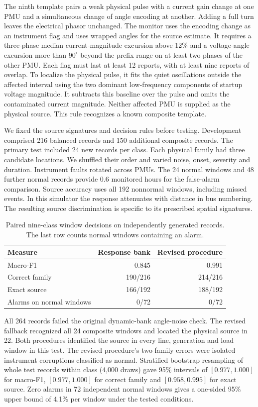 The ninth template pairs a weak physical pulse with a current gain
change at one PMU and a simultaneous change of angle encoding at
another. Adding a full turn leaves the electrical phasor unchanged.
The monitor uses the encoding change as an instrument flag and uses
wrapped angles for the source estimate. It requires a three-phase
median current-magnitude excursion above 12\% and a voltage-angle
excursion more than $90^\circ$ beyond the prefix range on at least two
phases of the other PMU. Each flag must last at least 12 reports, with
at least nine reports of overlap. To localize the physical pulse, it
fits the quiet oscillations outside the affected interval using the two
dominant low-frequency components of startup voltage magnitude. It
subtracts this baseline over the pulse and omits the contaminated
current magnitude. Neither affected PMU is supplied as the physical
source. This rule recognizes a known composite template.

We fixed the source signatures and decision rules before testing.
Development comprised 216 balanced records and 150 additional composite
records. The primary test included 24 new records per class. Each
physical family had three candidate locations. We shuffled their order
and varied noise, onset, severity and duration. Instrument faults
rotated across PMUs. The 24 normal windows and 48 further normal records
provide 0.6 monitored hours for the false-alarm comparison. Source
accuracy uses all 192 nonnormal windows, including missed events.
In this simulator the response attenuates with distance in bus
numbering. The resulting source discrimination is specific to its
prescribed spatial signatures.

\begin{table}[t]\centering\small
\caption{Paired nine-class window decisions on independently generated
records. The last row counts normal windows containing an alarm.}
\label{tab:window-source-comparison}
\begin{tabular}{lrr}\toprule
Measure & Response bank & Revised procedure\\\midrule
Macro-F1 & 0.845 & 0.991\\
Correct family & 190/216 & 214/216\\
Exact source & 166/192 & 188/192\\
Alarms on normal windows & 0/72 & 0/72\\\bottomrule
\end{tabular}
\end{table}

All 264 records failed the original dynamic-bank angle-noise check.
The revised fallback recognized all 24 composite windows and located
the physical source in 22. Both procedures identified the source in
every line, generation and load window in this test. The revised
procedure's two family errors were isolated instrument corruptions
classified as normal. Stratified bootstrap resampling of whole test
records within class (4,000 draws) gave 95\% intervals of
$[0.977,1.000]$ for macro-F1, $[0.977,1.000]$ for correct family and
$[0.958,0.995]$ for exact source. Zero alarms in 72 independent normal
windows gives a one-sided 95\% upper bound of 4.1\% per window under
the tested conditions.

